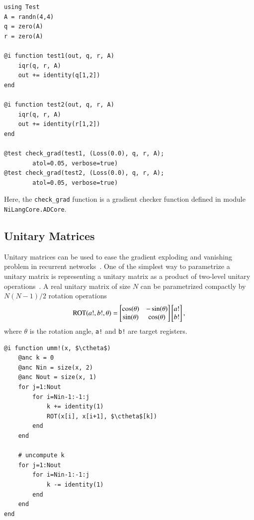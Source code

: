 \documentclass[aps,twocolumn,longbibliography,english,superscriptaddress]{revtex4-1}
\newcommand{\<}{\langle}
\renewcommand{\>}{\rangle}
\newcommand{\ctheta}{{\color{jlbase}{\rm \theta}}}
\theoremstyle{definition}\newtheorem{definition}{\textit{Definition}}
\begin{document}
\begin{minipage}{.44\textwidth}
\begin{lstlisting}
using Test
A = randn(4,4)
q = zero(A)
r = zero(A)

@i function test1(out, q, r, A)
    iqr(q, r, A)
    out += identity(q[1,2])
end

@i function test2(out, q, r, A)
    iqr(q, r, A)
    out += identity(r[1,2])
end

@test check_grad(test1, (Loss(0.0), q, r, A);
        atol=0.05, verbose=true)
@test check_grad(test2, (Loss(0.0), q, r, A);
        atol=0.05, verbose=true)
\end{lstlisting}
\end{minipage}

Here, the \texttt{check\_grad} function is a gradient checker function defined in module \texttt{NiLangCore.ADCore}.

\subsection{Unitary Matrices}\label{sec:umm}
Unitary matrices can be used to ease the gradient exploding and vanishing problem in recurrent networks~\cite{Arjovsky2015,Wisdom2016,Li2016}.
One of the simplest way to parametrize a unitary matrix is representing a unitary matrix as a product of two-level unitary operations~\cite{Li2016}. A real unitary matrix of size $N$ can be parametrized compactly by $N(N-1)/2$ rotation operations~\cite{Li2013}
\begin{align}
    {\rm ROT}(a!, b!, \theta)  = \begin{bmatrix}
        \cos(\theta) & - \sin(\theta)\\
        \sin(\theta)  & \cos(\theta)
    \end{bmatrix}
    \begin{bmatrix}
        a!\\
        b!
    \end{bmatrix},
\end{align}
where \texttt{$\theta$} is the rotation angle, \texttt{a!} and \texttt{b!} are target registers.

\begin{minipage}{.44\textwidth}
    \begin{lstlisting}[mathescape=true]
@i function umm!(x, $\ctheta$)
    @anc k = 0
    @anc Nin = size(x, 2)
    @anc Nout = size(x, 1)
    for j=1:Nout
        for i=Nin-1:-1:j
            k += identity(1)
            ROT(x[i], x[i+1], $\ctheta$[k])
        end
    end

    # uncompute k
    for j=1:Nout
        for i=Nin-1:-1:j
            k -= identity(1)
        end
    end
end
\end{lstlisting}
\end{minipage}
\end{document}
